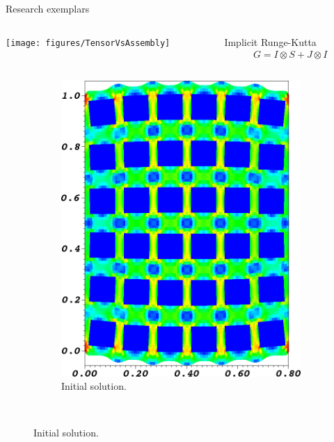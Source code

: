 \documentclass{beamer}
\begin{document}
\begin{frame}{Research exemplars}
 \begin{columns}
   \begin{column}{0.7\textwidth}
     \texttt{[image: figures/TensorVsAssembly]}
   \end{column}
   \begin{column}{0.3\textwidth}
     \begin{block}{Implicit Runge-Kutta}
       \begin{gather*}
         G = I \otimes S + J \otimes I
       \end{gather*}
     \end{block}
   \end{column}
 \end{columns}
 \begin{figure}
  \centering
  \begin{subfigure}[b]{0.18\textwidth}
    \includegraphics[width=\textwidth]{figures/MG/ElasticityCompressTrim}
    \caption{Initial solution.}\label{fig:elast-initial}
  \end{subfigure} ~

\end{figure}
\end{frame}
\end{document}
